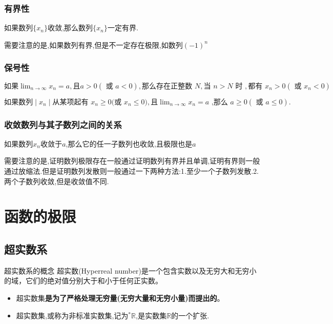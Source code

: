 \documentclass[12pt, a4paper, oneside, UTF8]{ctexbook}  %
\begin{document}
\begin{sloppypar}
    \subsubsection{有界性}
    \begin{them}{}{}
        如果数列$\{x_n\}$收敛,那么数列$\{x_n\}$一定有界.
    \end{them}
    \begin{criterion}{}{}
        需要注意的是,如果数列有界,但是不一定存在极限,如数列$(-1)^n$
    \end{criterion}
    \subsubsection{保号性}
    \begin{them}{}{}
        $\text{如果}\lim_{n\to\infty}x_n=a,\text{且}a{>}0(\text{ 或 }a{<}0),\text{那么存在正整数 }N,\text{当 }n{>}N\text{ 时 },\text{都有 }x_n{>}0\left(\text{ 或 }x_n{<}0\right)$
    \end{them}
    \begin{corollary}{}{}
        $\text{如果数列}\mid x_n\mid\text{从某项起有 }x_n\geqslant0\text{(或 }x_n\leqslant0\text{)},\text{且}\lim_{n\to\infty}x_n=a\text{ ,那么 }a\geqslant0(\text{ 或 }a\leqslant0).$
    \end{corollary}
    \subsubsection{收敛数列与其子数列之间的关系}
    如果数列${x_n}$收敛于$a$,那么它的任一子数列也收敛,且极限也是$a$
    \begin{criterion}{}{}
        需要注意的是,证明数列极限存在一般通过证明数列有界并且单调,证明有界则一般通过放缩法.但是证明数列发散则一般通过一下两种方法:1.至少一个子数列发散.2.两个子数列收敛,但是收敛值不同.
    \end{criterion}
    \section{函数的极限}
    \subsection{超实数系}
    \begin{defn}{超实数系的概念}{}
        超实数(Hyperreal number)是一个包含实数以及无穷大和无穷小的域，它们的绝对值分别大于和小于任何正实数。
    \end{defn}
    \begin{criterion}{}{}
        \begin{itemize}
            \item 超实数集\textbf{是为了严格处理无穷量(无穷大量和无穷小量)而提出的}。
            \item 超实数集,或称为非标准实数集,记为$^{*}\mathbb{R}$,是实数集$\mathbb{R}$的一个扩张.
        \end{itemize}
    \end{criterion}

\end{sloppypar}
\end{document}

